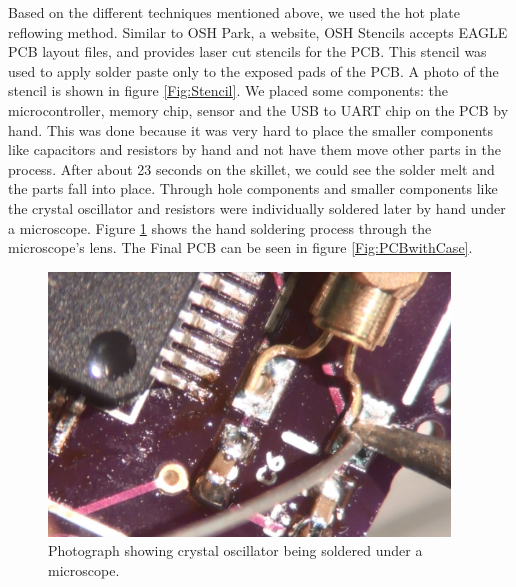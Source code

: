 Based on the different techniques mentioned above,
we used the hot plate reflowing method.
Similar to OSH Park, a website, OSH Stencils accepts EAGLE PCB layout files,
and provides laser cut stencils for the PCB.
This stencil was used to apply solder paste only to the exposed pads of the PCB.
A photo of the stencil is shown in figure \ref{Fig:Stencil}.
We placed some components: the microcontroller, memory chip,
sensor and the USB to UART chip on the PCB by hand.
This was done because it was very hard to place the smaller components
like capacitors and resistors by hand and not have them move other parts in the process.
After about 23 seconds on the skillet,
we could see the solder melt and the parts fall into place.
Through hole components and smaller components like the crystal oscillator and resistors were individually soldered later by hand under a microscope.
Figure \ref{Fig:PCBMicro} shows the hand soldering process through the microscope's lens. The Final PCB can be seen in figure \ref{Fig:PCBwithCase}.
\begin{figure}
\begin{center}
\includegraphics[width=0.95\textwidth]{images/PCBMicro.jpg}
\caption{Photograph showing crystal oscillator being soldered under a microscope.}
\label{Fig:PCBMicro}
\end{center}
\end{figure}
